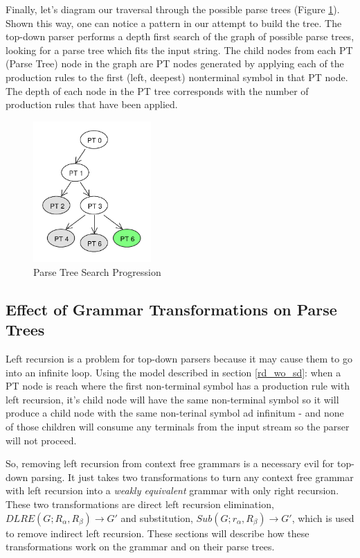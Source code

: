\documentclass[11pt]{article}
\begin{document}
Finally, let's diagram our traversal through the possible parse trees (Figure \ref{fig:rdp_7}). Shown this way, one can notice
a pattern in our attempt to build the tree. The top-down parser performs a depth first search of the 
graph of possible parse trees, looking for a parse tree which fits the input string.
The child nodes from each PT (Parse Tree) node in the graph are PT nodes generated by
applying each of the production rules to the first (left, deepest) nonterminal symbol in that PT node.
The depth of each node in the PT tree corresponds with the number of production rules that have been applied.

\begin{figure}[h!]
    \centering
    \includegraphics[width=0.4\textwidth,natwidth=30,natheight=30]{umlet/rdp_7.pdf}
    \caption{Parse Tree Search Progression}
    \label{fig:rdp_7}
\end{figure}

\clearpage

\subsection{Effect of Grammar Transformations on Parse Trees}
Left recursion is a problem for top-down parsers because it may cause them to
go into an infinite loop. Using the model described in section \ref{rd_wo_sd}:
when a PT node is reach where the first non-terminal symbol has a production rule with
left recursion, it's child node will have the same non-terminal symbol so it will produce
a child node with the same non-terinal symbol ad infinitum - and none of those children will
consume any terminals from the input stream so the parser will not proceed. 

So, removing left recursion from context free grammars is a necessary evil for top-down parsing.
It just takes two transformations to turn any context free grammar with left recursion
into a {\em weakly equivalent} grammar with only right recursion.
These two transformations are direct left recursion elimination, 
$DLRE(G; R_\alpha, R_\beta) \rightarrow G'$ and substitution, 
$Sub(G; r_\alpha, R_\beta) \rightarrow G'$, which is used to
remove indirect left recursion. \cite{aho, lewis}
These sections will describe how these transformations work on the grammar
and on their parse trees.
\end{document}
